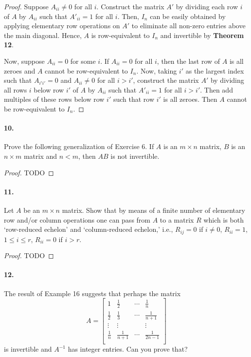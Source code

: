 \documentclass{article}
\begin{document}
\begin{proof}
  Suppose $A_{ii} \neq 0$ for all $i$. Construct the matrix $A'$ by dividing
  each row $i$ of $A$ by $A_{ii}$ such that $A'_{ii} = 1$ for all $i$. Then,
  $I_n$ can be easily obtained by applying elementary row operations on $A'$ to
  eliminate all non-zero entries above the main diagonal. Hence, $A$ is
  row-equivalent to $I_n$ and invertible by \textbf{Theorem 12}.

  Now, suppose $A_{ii} = 0$ for some $i$. If $A_{ii} = 0$ for all $i$, then the
  last row of $A$ is all zeroes and $A$ cannot be row-equivalent to $I_n$. Now,
  taking $i'$ as the largest index such that $A_{i'i'} = 0$ and $A_{ii} \neq 0$
  for all $i > i'$, construct the matrix $A'$ by dividing all rows $i$ below row
  $i'$ of $A$ by $A_{ii}$ such that $A'_{ii} = 1$ for all $i > i'$. Then add
  multiples of these rows below row $i'$ such that row $i'$ is all zeroes. Then
  $A$ cannot be row-equivalent to $I_n$.
\end{proof}

\paragraph{10.} Prove the following generalization of Exercise 6. If $A$ is an
$m \times n$ matrix, $B$ is an $n \times m$ matrix and $n < m$, then $AB$ is not
invertible.

\begin{proof}
  TODO
\end{proof}

\paragraph{11.} Let $A$ be an $m \times n$ matrix. Show that by means of a
finite number of elementary row and/or column operations one can pass from $A$
to a matrix $R$ which is both `row-reduced echelon' and `column-reduced
echelon,' i.e., $R_{ij} = 0$ if $i \neq 0$, $R_{ii} = 1$, $1 \leq i \leq r$,
$R_{ii} = 0$ if $i > r$.

\begin{proof}
  TODO
\end{proof}

\paragraph{12.} The result of Example 16 suggests that perhaps the matrix \[
  A = \begin{bmatrix}
    1 & \frac{1}{2} & \cdots & \frac{1}{n} \\
    \frac{1}{2} & \frac{1}{3} & \cdots & \frac{1}{n + 1} \\
    \vdots & \vdots & & \vdots \\
    \frac{1}{n} & \frac{1}{n + 1} & \cdots & \frac{1}{2n - 1} \\
  \end{bmatrix}
\] is invertible and $A^{-1}$ has integer entries. Can you prove that?
\end{document}
